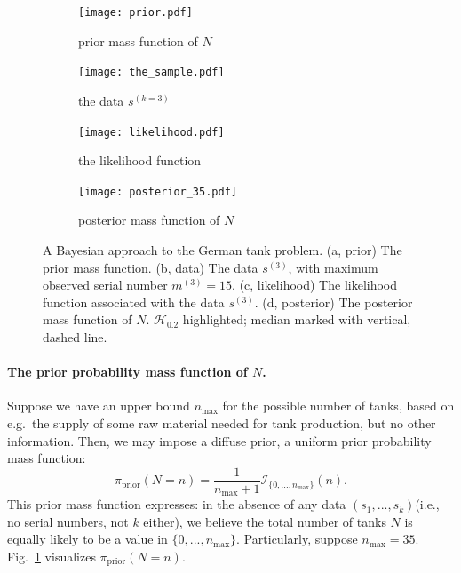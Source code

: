 \documentclass[11pt, oneside]{article}
\newcommand{\data}{$(s_1, ..., s_k)$\xspace}
\begin{document}
\begin{figure}[h!]
	\centering
	\begin{subfigure}[b]{0.4\textwidth}
		\texttt{[image: prior.pdf]} \caption{prior mass function of $N$} \label{fig:the_prior}
	\end{subfigure} 
	
	\begin{subfigure}[b]{0.5\textwidth}
		\texttt{[image: the\_sample.pdf]} 
	\caption{the data $s^{(k=3)}$} \label{fig:the_data}
	\end{subfigure}
	\begin{subfigure}[b]{0.4\textwidth}
		\texttt{[image: likelihood.pdf]} \caption{the likelihood function} 		
		\label{fig:the_likelihood}
	\end{subfigure}

	\begin{subfigure}[b]{0.4\textwidth}
		\texttt{[image: posterior\_35.pdf]} \caption{posterior mass function of $N$} \label{fig:the_posterior}
	\end{subfigure}
	\caption{A Bayesian approach to the German tank problem. 
	(a, prior) The prior mass function.
	(b, data) The data $s^{(3)}$, with maximum observed serial number $m^{(3)}=15$.
	(c, likelihood) The likelihood function associated with the data $s^{(3)}$.
	(d, posterior) The posterior mass function of $N$. $\mathcal{H}_{0.2}$ highlighted; median marked with vertical, dashed line.
	}
\end{figure}

\paragraph{The prior probability mass function of $N$.}
Suppose we have an upper bound $n_{\text{max}}$ for the possible number of tanks, based on e.g.\ the supply of some raw material needed for tank production, but no other information. Then, we may impose a diffuse prior, a uniform prior probability mass function:
\begin{equation}
	\pi_{\text{prior}}(N=n) = \dfrac{1}{n_{\max}+1} \mathcal{I}_{ \{0, ..., n_{\text{max}}\}}(n).	 \label{eq:prior}
\end{equation} 
This prior mass function expresses: in the absence of any data \data (i.e., no serial numbers, not $k$ either), we believe the total number of tanks $N$ is equally likely to be a value in $\{0, ..., n_{\text{max}}\}$. Particularly, suppose $n_\text{max}=35$. Fig.~\ref{fig:the_prior} visualizes $\pi_{\text{prior}}(N=n)$.
\end{document}
